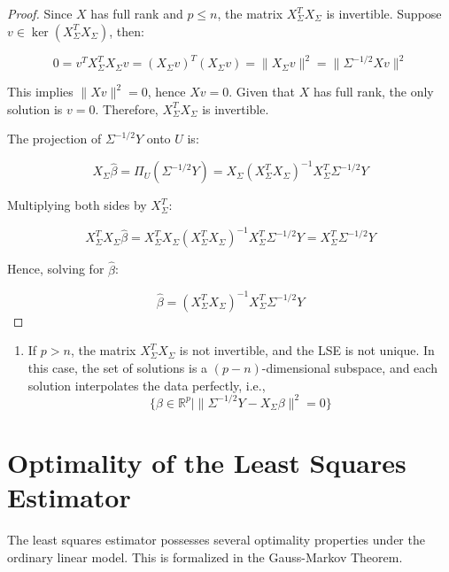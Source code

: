 \documentclass[open=any, 11pt,paper=A4]{scrreprt}
\begin{document}
\begin{proof}
    Since \( X \) has full rank and \( p \le n \), the matrix \( X_\Sigma^T X_\Sigma \) is invertible. Suppose \( v \in \ker(X_\Sigma^T X_\Sigma) \), then:

    \[
    0 = v^T X_\Sigma^T X_\Sigma v = (X_\Sigma v)^T (X_\Sigma v) = \| X_\Sigma v \|^2 = \| \Sigma^{-1/2} X v \|^2
    \]

    This implies \( \| X v \|^2 = 0 \), hence \( X v = 0 \). Given that \( X \) has full rank, the only solution is \( v = 0 \). Therefore, \( X_\Sigma^T X_\Sigma \) is invertible.

    The projection of \( \Sigma^{-1/2} Y \) onto \( U \) is:

    \[
    X_\Sigma \hat{\beta} = \Pi_U(\Sigma^{-1/2} Y) = X_\Sigma (X_\Sigma^T X_\Sigma)^{-1} X_\Sigma^T \Sigma^{-1/2} Y
    \]

    Multiplying both sides by \( X_\Sigma^T \):

    \[
    X_\Sigma^T X_\Sigma \hat{\beta} = X_\Sigma^T X_\Sigma (X_\Sigma^T X_\Sigma)^{-1} X_\Sigma^T \Sigma^{-1/2} Y = X_\Sigma^T \Sigma^{-1/2} Y
    \]

    Hence, solving for \( \hat{\beta} \):

    \[
    \hat{\beta} = (X_\Sigma^T X_\Sigma)^{-1} X_\Sigma^T \Sigma^{-1/2} Y
    \]
\end{proof}

\begin{remark}
    \begin{enumerate}
        \item If \( p > n \), the matrix \( X_\Sigma^T X_\Sigma \) is not invertible, and the LSE is not unique. In this case, the set of solutions is a \( (p - n) \)-dimensional subspace, and each solution interpolates the data perfectly, i.e.,
        \[
        \{ \beta \in \mathbb{R}^p \mid \| \Sigma^{-1/2} Y - X_\Sigma \beta \|^2 = 0 \}
        \]
    \end{enumerate}
\end{remark}

\section{Optimality of the Least Squares Estimator}

The least squares estimator possesses several optimality properties under the ordinary linear model. This is formalized in the Gauss-Markov Theorem.
\end{document}
